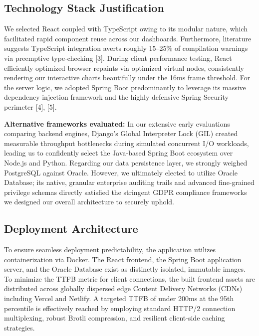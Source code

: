 \subsection{Technology Stack
Justification}\label{technology-stack-justification}

We selected React coupled with TypeScript owing to its modular nature,
which facilitated rapid component reuse across our dashboards.
Furthermore, literature suggests TypeScript integration averts roughly
15--25\% of compilation warnings via preemptive type-checking {[}3{]}.
During client performance testing, React efficiently optimized browser
repaints via optimized virtual nodes, consistently rendering our
interactive charts beautifully under the 16ms frame threshold. For the
server logic, we adopted Spring Boot predominantly to leverage its
massive dependency injection framework and the highly defensive Spring
Security perimeter {[}4{]}, {[}5{]}.

\textbf{Alternative frameworks evaluated:} In our extensive early
evaluations comparing backend engines, Django's Global Interpreter Lock
(GIL) created measurable throughput bottlenecks during simulated
concurrent I/O workloads, leading us to confidently select the
Java-based Spring Boot ecosystem over Node.js and Python. Regarding our
data persistence layer, we strongly weighed PostgreSQL against Oracle.
However, we ultimately elected to utilize Oracle Database; its native,
granular enterprise auditing trails and advanced fine-grained privilege
schemas directly satisfied the stringent GDPR compliance frameworks we
designed our overall architecture to securely uphold.

\subsection{Deployment Architecture}\label{deployment-architecture}

To ensure seamless deployment predictability, the application utilizes
containerization via Docker. The React frontend, the Spring Boot
application server, and the Oracle Database exist as distinctly
isolated, immutable images. To minimize the TTFB metric for client
connections, the built frontend assets are distributed across globally
dispersed edge Content Delivery Networks (CDNs) including Vercel and
Netlify. A targeted TTFB of under 200ms at the 95th percentile is
effectively reached by employing standard HTTP/2 connection
multiplexing, robust Brotli compression, and resilient client-side
caching strategies.

